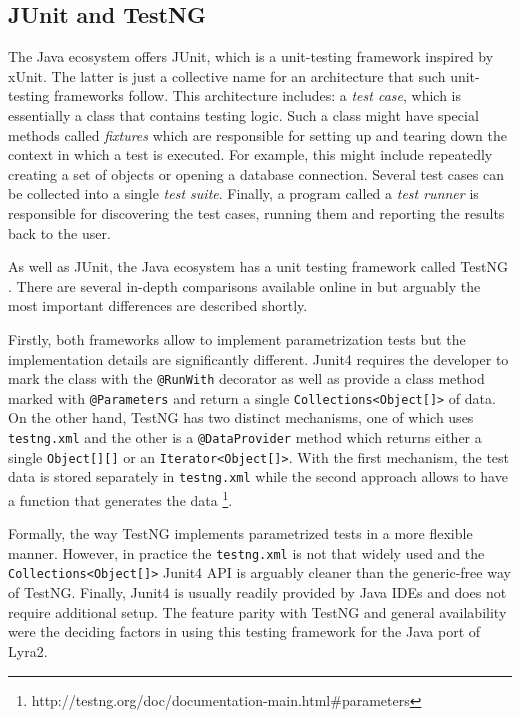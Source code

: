 \subsection{JUnit and TestNG}
\label{sec:unit-junit-testng}

The Java ecosystem offers JUnit, which is a unit-testing framework inspired by xUnit. The latter is just a collective name for an architecture that such unit-testing frameworks follow. This architecture includes: a \emph{test case}, which is essentially a class that contains testing logic. Such a class might have special methods called \emph{fixtures} which are responsible for setting up and tearing down the context in which a test is executed. For example, this might include repeatedly creating a set of objects or opening a database connection. Several test cases can be collected into a single \emph{test suite}. Finally, a program called a \emph{test runner} is responsible for discovering the test cases, running them and reporting the results back to the user.

As well as JUnit, the Java ecosystem has a unit testing framework called TestNG \cite{testng:2017:home}. There are several in-depth comparisons available online in \cite{mkyong:2017:testng-vs-junit, wiki:2017:testng-vs-junit} but arguably the most important differences are described shortly.

Firstly, both frameworks allow to implement parametrization tests but the implementation details are significantly different. Junit4 requires the developer to mark the class with the \texttt{@RunWith} decorator as well as provide a class method marked with \texttt{@Parameters} and return a single \texttt{Collections<Object[]>} of data. On the other hand, TestNG has two distinct mechanisms, one of which uses \texttt{testng.xml} and the other is a \texttt{@DataProvider} method which returns either a single \texttt{Object[][]} or an \texttt{Iterator<Object[]>}. With the first mechanism, the test data is stored separately in \texttt{testng.xml} while the second approach allows to have a function that generates the data \footnote{http://testng.org/doc/documentation-main.html\#parameters}.

Formally, the way TestNG implements parametrized tests in a more flexible manner. However, in practice the \texttt{testng.xml} is not that widely used and the \texttt{Collections<Object[]>} Junit4 API is arguably cleaner than the generic-free way of TestNG. Finally, Junit4 is usually readily provided by Java IDEs and does not require additional setup. The feature parity with TestNG and general availability were the deciding factors in using this testing framework for the Java port of Lyra2.

